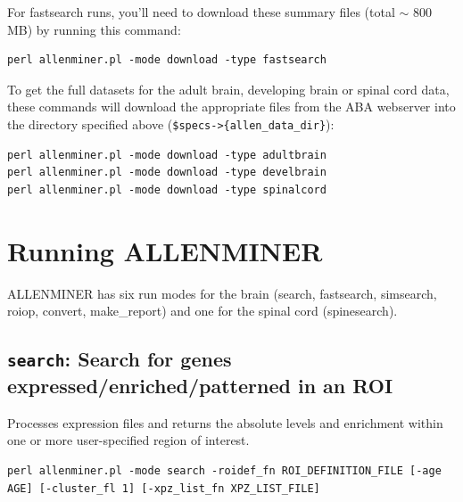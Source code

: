 \documentclass[10pt]{article}
\begin{document}
For fastsearch runs, you'll need to download these summary files (total $\sim$ 800 MB) by running this command:
\lstset{breaklines=true,language=bash}
\lstset{frame=single}
\lstset{basicstyle=\ttfamily}
\begin{lstlisting}
perl allenminer.pl -mode download -type fastsearch
\end{lstlisting}

To get the full datasets for the adult brain, developing brain or spinal cord data, these commands will download the appropriate files from the ABA webserver into the directory specified above ({\tt \$specs->\{allen\_data\_dir\}}):
\lstset{breaklines=true,language=bash}
\lstset{frame=single}
\lstset{basicstyle=\ttfamily}
\begin{lstlisting}
perl allenminer.pl -mode download -type adultbrain
perl allenminer.pl -mode download -type develbrain
perl allenminer.pl -mode download -type spinalcord
\end{lstlisting}

\section{Running ALLENMINER}
ALLENMINER has six run modes for the brain (search, fastsearch, simsearch, roiop, convert, make\_report) and  one for the spinal cord (spinesearch).

\subsection{{\tt search}: Search for genes expressed/enriched/patterned in an ROI}

Processes expression files and returns the absolute levels and enrichment within one or more user-specified region of interest.\\

\begin{lstlisting}
perl allenminer.pl -mode search -roidef_fn ROI_DEFINITION_FILE [-age AGE] [-cluster_fl 1] [-xpz_list_fn XPZ_LIST_FILE]
\end{lstlisting}
\end{document}
